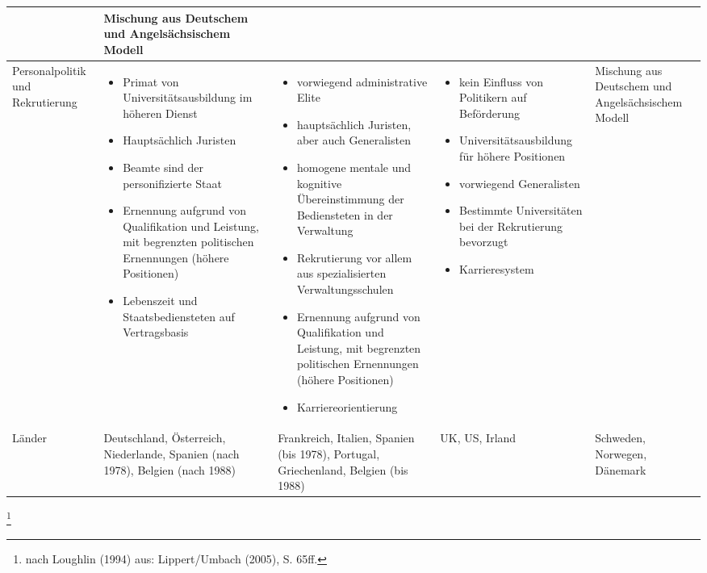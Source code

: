 \begin{landscape}
\begin{table}[!hbt]
\begin{tabular}{|p{4cm}|p{5cm}|p{5cm}|p{5cm}|p{4cm}|}
&	Mischung aus Deutschem und Angelsächsischem Modell\\\hline
Personalpolitik und Rekrutierung&
\begin{itemize}[leftmargin=*]
\item Primat von Universitätsausbildung im höheren Dienst
\item Hauptsächlich Juristen
\item Beamte sind der personifizierte Staat
\item Ernennung aufgrund von Qualifikation und Leistung, mit begrenzten politischen Ernennungen (höhere Positionen)
\item Lebenszeit und Staatsbediensteten auf Vertragsbasis	
\end{itemize}&
 \vspace{-3mm}
\begin{itemize}[leftmargin=*]
\item vorwiegend administrative Elite
\item hauptsächlich Juristen, aber auch Generalisten
\item homogene mentale und kognitive Übereinstimmung der Bediensteten in der Verwaltung                             \item Rekrutierung vor allem aus spezialisierten Verwaltungsschulen
\item Ernennung aufgrund von Qualifikation und Leistung, mit begrenzten politischen Ernennungen (höhere Positionen)
\item Karriereorientierung
 \vspace{-3mm}
\end{itemize}
&
\begin{itemize}[leftmargin=*]
\item kein Einfluss von Politikern auf Beförderung
\item Universitätsausbildung für höhere Positionen
\item  vorwiegend Generalisten
\item Bestimmte Universitäten bei der Rekrutierung bevorzugt
\item Karrieresystem
\end{itemize}&	Mischung aus Deutschem und Angelsächsischem Modell\\\hline
Länder&	Deutschland, Österreich, Niederlande, Spanien (nach 1978), Belgien (nach 1988)&	Frankreich, Italien, Spanien (bis 1978), Portugal, Griechenland, Belgien (bis 1988) 	&UK, US, Irland&	Schweden, Norwegen, Dänemark\\\hline
\end{tabular}
\end{table}	\footnote{nach Loughlin (1994) aus: Lippert/Umbach (2005), S. 65ff.}
\end{landscape}	
